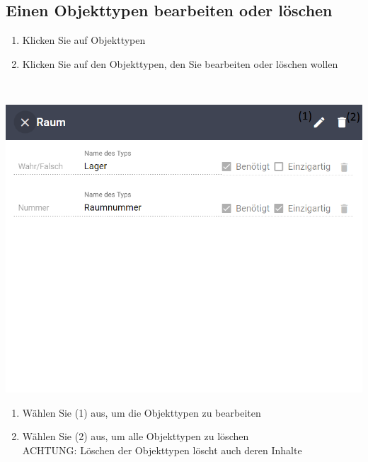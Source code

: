 \documentclass[11pt,a4paper]{report}
\begin{document}
	\subsection{Einen Objekttypen bearbeiten oder löschen}

	\begin{enumerate}
		\item Klicken Sie auf \glqq{}Objekttypen\grqq{}
		\item Klicken Sie auf den Objekttypen, den Sie bearbeiten oder löschen wollen
	\end{enumerate}\\

	\begin{minipage}{0.4\linewidth}
	\includegraphics[scale=0.55]{Objekttypedit.png}
	\end{minipage}
	\hfill
	\begin{minipage}{0.4\linewidth}
	\begin{enumerate}[3]
		\item Wählen Sie (1) aus, um die Objekttypen zu bearbeiten
		\item Wählen Sie (2) aus, um alle Objekttypen zu löschen\\
		ACHTUNG: Löschen der Objekttypen löscht auch deren Inhalte
	\end{enumerate}
	\end{minipage}\\
\end{document}
